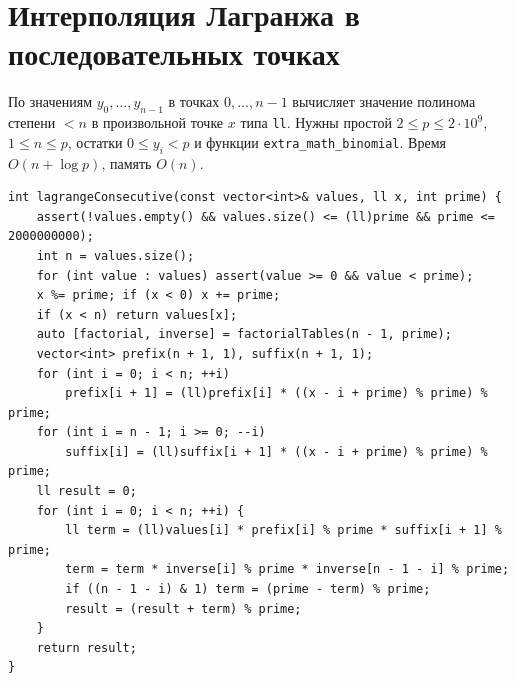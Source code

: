 \section{Интерполяция Лагранжа в последовательных точках}
По значениям $y_0,\ldots,y_{n-1}$ в точках $0,\ldots,n-1$ вычисляет значение полинома степени $<n$ в произвольной точке $x$ типа \texttt{ll}.
Нужны простой $2\le p\le2\cdot10^9$, $1\le n\le p$, остатки $0\le y_i<p$ и функции \texttt{extra\_math\_binomial}.
Время $O(n+\log p)$, память $O(n)$.
\begin{lstlisting}[name=extra_math_lagrange]
int lagrangeConsecutive(const vector<int>& values, ll x, int prime) {
    assert(!values.empty() && values.size() <= (ll)prime && prime <= 2000000000);
    int n = values.size();
    for (int value : values) assert(value >= 0 && value < prime);
    x %= prime; if (x < 0) x += prime;
    if (x < n) return values[x];
    auto [factorial, inverse] = factorialTables(n - 1, prime);
    vector<int> prefix(n + 1, 1), suffix(n + 1, 1);
    for (int i = 0; i < n; ++i)
        prefix[i + 1] = (ll)prefix[i] * ((x - i + prime) % prime) % prime;
    for (int i = n - 1; i >= 0; --i)
        suffix[i] = (ll)suffix[i + 1] * ((x - i + prime) % prime) % prime;
    ll result = 0;
    for (int i = 0; i < n; ++i) {
        ll term = (ll)values[i] * prefix[i] % prime * suffix[i + 1] % prime;
        term = term * inverse[i] % prime * inverse[n - 1 - i] % prime;
        if ((n - 1 - i) & 1) term = (prime - term) % prime;
        result = (result + term) % prime;
    }
    return result;
}
\end{lstlisting}
\fi

%

